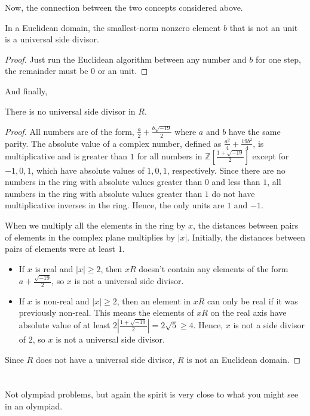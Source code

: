 Now, the connection between the two concepts considered above.
\begin{lemma}
	In a Euclidean domain,
	the smallest-norm nonzero element $b$ that is not an unit is a universal side divisor.
\end{lemma}
\begin{proof}
	Just run the Euclidean algorithm between any number and $b$ for one step, the remainder must be
	$0$ or an unit.
\end{proof}

And finally,
\begin{proposition}
	There is no universal side divisor in $R$.
\end{proposition}
\begin{proof}
All numbers are of the form, $\frac{a}{2} + \frac{b\sqrt{-19}}{2}$ where $a$ and $b$ have the same parity. The absolute value of a complex number, defined as $\frac{a^2}{4} + \frac{19b^2}{4}$, is multiplicative and is greater than $1$ for all numbers in $\mathbb Z [\frac{1+\sqrt{-19}}{2}]$ except for $-1, 0, 1$, which have absolute values of $1, 0, 1$, respectively. Since there are no numbers in the ring with absolute values greater than $0$ and less than $1$, all numbers in the ring with absolute values greater than $1$ do not have multiplicative inverses in the ring. Hence, the only units are $1$ and $-1$.

When we multiply all the elements in the ring by $x$, the distances between pairs of elements in the complex plane multiplies by $|x|$. Initially, the distances between pairs of elements were at least $1$.
\begin{itemize}
\item If $x$ is real and $|x| \geq 2$, then $xR$ doesn't contain any elements of the form $a + \frac{\sqrt{-19}}{2}$, so $x$ is not a universal side divisor.
\item If $x$ is non-real and $|x| \geq 2$, then an element in $xR$ can only be real if it was previously non-real. This means the elements of $xR$ on the real axis have absolute value of at least $2|\frac{1+\sqrt{-19}}{2}| = 2\sqrt{5} \geq 4$. Hence, $x$ is not a side divisor of $2$, so $x$ is not a universal side divisor.
\end{itemize}
Since $R$ does not have a universal side divisor, $R$ is not an Euclidean domain.
\end{proof}

\section{\problemhead}
Not olympiad problems, but again the spirit is very close
to what you might see in an olympiad.

